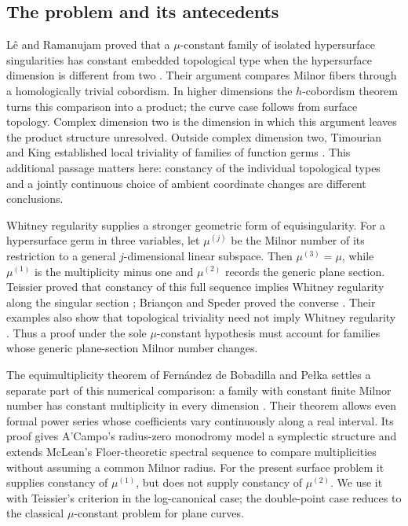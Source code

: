 \subsection*{The problem and its antecedents}

L\^e and Ramanujam proved that a $\mu$-constant family of isolated
hypersurface singularities has constant embedded topological type when
the hypersurface dimension is different from two
\cite[Theorem~2.1]{LeRamanujam1976}.  Their argument compares Milnor
fibers through a homologically trivial cobordism.  In higher dimensions
the $h$-cobordism theorem turns this comparison into a product; the
curve case follows from surface topology.  Complex dimension two is
the dimension in which this argument leaves the product structure
unresolved.  Outside complex dimension two, Timourian and King established local
triviality of families of function germs
\cite{Timourian1977,King1980}.  This additional passage matters here:
constancy of the individual topological types and a jointly continuous
choice of ambient coordinate changes are different conclusions.

Whitney regularity supplies a stronger geometric form of equisingularity.
For a hypersurface germ in three variables, let $\mu^{(j)}$ be the
Milnor number of its restriction to a general $j$-dimensional linear
subspace.  Then $\mu^{(3)}=\mu$, while $\mu^{(1)}$ is the multiplicity
minus one and $\mu^{(2)}$ records the generic plane section.  Teissier
proved that constancy of this full sequence implies Whitney regularity
along the singular section \cite[Chapter~II, Theorem~3.9]{Teissier1973};
Brian\c con and Speder proved the converse
\cite[Theorem~2]{BrianconSpeder1976}.  Their examples also show that
topological triviality need not imply Whitney regularity
\cite{BrianconSpeder1975}\cite[Section~3]{BrianconSpeder1976}.
Thus a proof under the sole $\mu$-constant hypothesis must account for
families whose generic plane-section Milnor number changes.

The equimultiplicity theorem of Fern\'andez de Bobadilla and Pe\l ka
settles a separate part of this numerical comparison: a family with
constant finite Milnor number has constant multiplicity in every
dimension \cite[Theorem~1.1]{FernandezBobadillaPelka2024}.  Their theorem
allows even formal power series whose coefficients vary continuously
along a real interval.  Its proof gives A'Campo's radius-zero
monodromy model a symplectic structure and extends McLean's
Floer-theoretic spectral sequence to compare multiplicities without
assuming a common Milnor radius.  For the present surface problem it supplies constancy of
$\mu^{(1)}$, but does not supply constancy of $\mu^{(2)}$.  We use it
with Teissier's criterion in the log-canonical case; the double-point
case reduces to the classical $\mu$-constant problem for plane curves.

